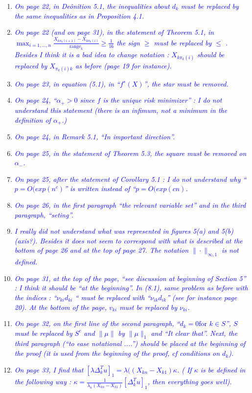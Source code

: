 \documentclass[pdftex,12pt]{article}
\def\rc#1{{\it\textcolor{blue}{#1}}\smallskip}
\begin{document}
\begin{enumerate}
\item \rc{On page 22, in Deônition 5.1, the inequalities
  about $d_k$ must be replaced by the same inequalities as in Proposition 4.1.}

\item \rc{On page 22 (and on page 31), in the statement of Theorem
  5.1, in\\ $\max_{i=1,\ldots, n} \frac{X_{k\pi_k(i+1)}-
    X_{k\pi_k(i)}}{\text{range}_k} \geq \frac{1}{16}$ the
sign $\geq$ must be replaced by $\leq$ . Besides I think it
is a bad idea to change notation : $X_{k\pi_k(i)}$ should
be replaced by $X_{\pi_k(i)k}$ as before (page 19 for instance).}

\item \rc{On page 23, in equation (5.1), in ``$f^∗(X)$'', the star must be
removed.}

\item \rc{On page 24, ``$\alpha_{+} > 0$ since $f$ is the unique risk minimizer'' : I do
not understand this statement (there is an infimum, not a minimum in
the definition of $\alpha_{+}$.)}
\item \rc{On page 24, in Remark 5.1, ``In important direction''.}
\item \rc{On page 25, in the statement of Theorem 5.3, the square must be
removed on $\alpha_-$.}

\item \rc{On page 25, after the statement of Corollary 5.1 : I do not understand
why ``$p = O(exp(n^c)$'' is written instead of ``$p = O(exp(cn)$.}
\item \rc{On page 26, in the first paragraph ``the relevant variable set'' and
in the third paragraph, ``seting''.}
\item \rc{I really did not understand what was represented in figures 5(a) and
5(b) (axis?). Besides it does not seem to correspond with what is
described at the bottom of page 26 and at the top of page 27. The
notation $\|\cdot\|_{\infty,1}$ is not defined.}
\item \rc{On page 31, at the top of the page, ``see discussion at beginning of
Section 5'' : I think it should be ``at the beginning''. In (8.1),
same problem as before with the indices : ``$\nu_{ki} d_{ki}$ `` must be replaced
with ``$\nu_{ik}d_{ik}$'' (see for instance page 20). At the bottom of the page,
$v_{ki}$ must be replaced by $\nu_{ki}$.}
\item \rc{On page 32, on the first line of the second paragraph, ``$d_k = 0 \mbox{for $k
\in S$}$'', $S$ must be replaced by $S^c$ and $\|\mu\|$ by $\|\mu\|_1$ and ``It clear
that''. Next, the third paragraph (``to ease notational ....'') should
be placed at the beginning of the proof (it is used from the beginning
of the proof, cf conditions on $d_k$).}
\item \rc{On page 33, I find that $[\lambda\Delta_k^Tu]_1 = \lambda((X_{kn} −X_{k1})\kappa$. ( If $\kappa$ is be defined
in the following way : $\kappa =
\frac{1}{\lambda_n(X_{kn}-X_{k1})}[\Delta_k^T u]_1$, then everything
goes well).}


\end{enumerate}
\end{document}
